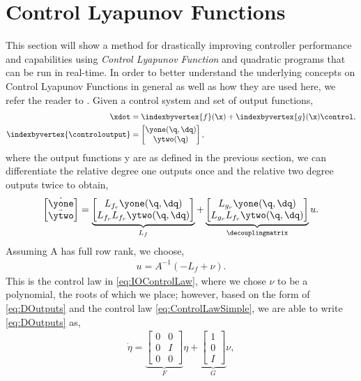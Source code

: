 \section{Control Lyapunov Functions}
This section will show a method for drastically improving controller performance and capabilities using \emph{Control Lyapunov Function} and 
quadratic programs that can be run in real-time. In order to better understand the underlying concepts on Control Lyapunov Functions in general as well as how they are 
used here, we refer the reader to \cite{AGG:CDC:2012} . Given a control 
system and set of output functions,
\begin{align}
\xdot &= \indexbyvertex{f}(\x) + \indexbyvertex{g} (\x) \control,\\
\indexbyvertex{\controloutput} &=
 \begin{bmatrix}
  \yone(\q,\dq) \\
  \ytwo(\q)
 \end{bmatrix} \nonumber,
\end{align}
where the output functions y are as defined in the previous section, we can differentiate the relative degree one outputs once and 
the relative two degree outputs twice to obtain,
\begin{align}
\label{eq:DOutputs}
  \begin{bmatrix}
    {\dot \yone} \\
    {\ddot \ytwo}
  \end{bmatrix}
   = 
  \underbrace{\begin{bmatrix}
    L_{f_r}\yone(\q,\dq) \\
    L_{f_r}L_{f_r}\ytwo(\q,\dq)
  \end{bmatrix}}_{L_{f}}
  +
  \underbrace{\begin{bmatrix}
    L_{g_r}\yone(\q,\dq) \\
    L_{g_r}L_{f_r}\ytwo(\q,\dq)
  \end{bmatrix}}_{\decouplingmatrix}
  u.
\end{align}
Assuming A has full row rank, we choose,
\begin{align}
\label{eq:ControlLawSimple}
 u = A^{-1}(-L_{f} + \nu).
\end{align}
This is the control law in \eqref{eq:IOControlLaw}, where we chose $\nu$ to be a polynomial, the roots of which we place; however,
based on the form of \eqref{eq:DOutputs} and the control law \eqref{eq:ControlLawSimple}, we are able to write \eqref{eq:DOutputs} as,
\begin{align}
\label{eq:etalinear}
  \dot{\eta} = 
  \underbrace{\begin{bmatrix}
   0 & 0 \\
   0 & I \\
   0 & 0 
  \end{bmatrix}}_{F}
\eta + 
  \underbrace{\begin{bmatrix}
   1 \\
   0 \\
   I
  \end{bmatrix}}_{G}
\nu,
\end{align}
